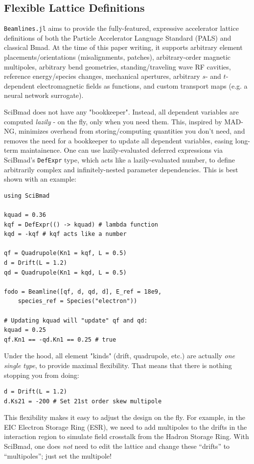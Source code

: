 \documentclass[a4paper,
               biblatex,     %
               ]{jacow}
\begin{document}

\subsection{Flexible Lattice Definitions}
\texttt{Beamlines.jl} aims to provide the fully-featured, expressive accelerator lattice definitions of both the Particle Accelerator Language Standard (PALS) \cite{huebl:napac2025-tup004} and classical Bmad. At the time of this paper writing, it supports arbitrary element placements/orientations (misalignments, patches), arbitrary-order magnetic multipoles, arbitrary bend geometries, standing/traveling wave RF cavities, reference energy/species changes, mechanical apertures, arbitrary $s$- and $t$-dependent electromagnetic fields as functions, and custom transport maps (e.g. a neural network surrogate).

SciBmad does not have any "bookkeeper". Instead, all dependent variables are computed \textit{lazily} - on the fly, only when you need them. This, inspired by MAD-NG, minimizes overhead from storing/computing quantities you don't need, and removes the need for a bookkeeper to update all dependent variables, easing long-term maintainence. One can use lazily-evaluated deferred expressions via SciBmad's \texttt{DefExpr} type, which acts like a lazily-evaluated number, to define arbitrarily complex and infinitely-nested parameter dependencies. This is best shown with an example:
\begin{verbatim}
using SciBmad

kquad = 0.36
kqf = DefExpr(() -> kquad) # lambda function
kqd = -kqf # kqf acts like a number

qf = Quadrupole(Kn1 = kqf, L = 0.5)
d = Drift(L = 1.2)
qd = Quadrupole(Kn1 = kqd, L = 0.5)

fodo = Beamline([qf, d, qd, d], E_ref = 18e9, 
	species_ref = Species("electron"))
	
# Updating kquad will "update" qf and qd:
kquad = 0.25
qf.Kn1 == -qd.Kn1 == 0.25 # true
\end{verbatim}
Under the hood, all element "kinds" (drift, quadrupole, etc.) are actually \textit{one single type}, to provide maximal flexibility. That means that there is nothing stopping you from doing:
\begin{verbatim}
d = Drift(L = 1.2)
d.Ks21 = -200 # Set 21st order skew multipole 
\end{verbatim}
This flexibility makes it easy to adjust the design on the fly. For example, in the EIC Electron Storage Ring (ESR), we need to add multipoles to the drifts in the interaction region to simulate field crosstalk from the Hadron Storage Ring. With SciBmad, one does \textit{not} need to edit the lattice and change these ``drifts'' to ``multipoles''; just set the multipole!
\end{document}
